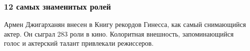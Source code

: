  
 
 

\subsubsection{12 самых знаменитых ролей}

Армен Джигарханян внесен в Книгу рекордов Гинесса, как самый снимающийся
актер. Он сыграл 283 роли в кино. Колоритная внешность, запоминающийся
голос и актерский талант привлекали режиссеров.

